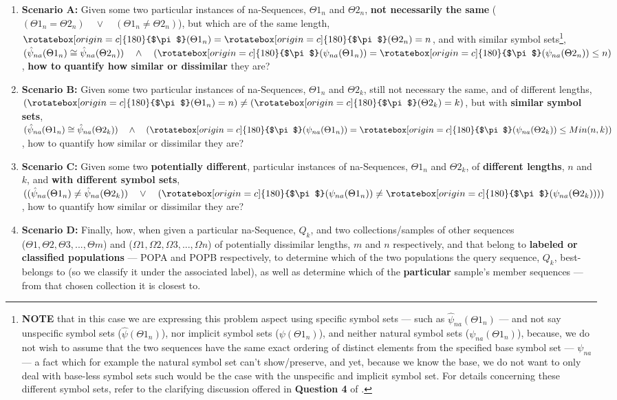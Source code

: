 \documentclass[a4paper, 18pt]{book} %
\newcommand{\invpi}{\rotatebox[origin=c]{180}{$\pi$}}
\begin{document}
\begin{enumerate}
\item \textbf{Scenario A:} Given some two particular instances of na-Sequences, $\Theta1_n$ and $\Theta2_n$, \textbf{not necessarily the same} ($(\Theta1_n = \Theta2_n) \quad \lor \quad (\Theta1_n \neq \Theta2_n)$), but which are of the same length, $\invpi(\Theta1_n) = \invpi(\Theta2_n) = n$, and with similar symbol sets\footnote{\textbf{NOTE} that in this case we are expressing this problem aspect using specific symbol sets --- such as $\hat{\psi}_{na}(\Theta1_n)$ --- and not say unspecific symbol sets ($\hat{\psi}(\Theta1_n)$), nor implicit symbol sets ($\psi(\Theta1_n)$), and neither natural symbol sets ($\psi_{na}(\Theta1_n)$), because, we do not wish to assume that the two sequences have the same exact ordering of distinct elements from the specified base symbol set --- $\psi_{na}$ --- a fact which for example the natural symbol set can't show/preserve, and yet, because we know the base, we do not want to only deal with base-less symbol sets such would be the case with the unspecific and implicit symbol set. For details concerning these different symbol sets, refer to the clarifying discussion offered in \textbf{Question 4} of \cite{transformatics_interview}.}, $(\hat{\psi}_{na}(\Theta1_n) \cong \hat{\psi}_{na}(\Theta2_n)) \quad \land \quad (\invpi(\psi_{na}(\Theta1_n)) = \invpi(\psi_{na}(\Theta2_n)) \leq n)$, \textbf{how to quantify how similar or dissimilar} they are?
\item \textbf{Scenario B:} Given some two particular instances of na-Sequences, $\Theta1_n$ and $\Theta2_k$, still not necessary the same, and of different lengths, $(\invpi(\Theta1_n) = n) \neq (\invpi(\Theta2_k) = k)$, but with \textbf{similar symbol sets}, $(\hat{\psi}_{na}(\Theta1_n) \cong \hat{\psi}_{na}(\Theta2_k)) \quad \land \quad (\invpi(\psi_{na}(\Theta1_n)) = \invpi(\psi_{na}(\Theta2_k)) \leq Min(n,k))$, how to quantify how similar or dissimilar they are?
\item \textbf{Scenario C:} Given some two \textbf{potentially different}, particular instances of na-Sequences, $\Theta1_n$ and $\Theta2_k$, of \textbf{different lengths}, $n$ and $k$, and \textbf{with different symbol sets}, $((\hat{\psi}_{na}(\Theta1_n) \neq \hat{\psi}_{na}(\Theta2_k)) \quad \lor \quad (\invpi(\psi_{na}(\Theta1_n)) \neq \invpi(\psi_{na}(\Theta2_k))))$, how to quantify how similar or dissimilar they are?
\item \textbf{Scenario D:} Finally, how, when given a particular na-Sequence, $Q_k$, and two collections/samples of other sequences\\
 ($\Theta1, \Theta2, \Theta3,..., \Theta m$) and ($\Omega1, \Omega2, \Omega3,..., \Omega n$) of potentially dissimilar lengths, $m$ and $n$ respectively, and that belong to \textbf{labeled or classified populations} --- POPA and POPB respectively, to determine which of the two populations the query sequence, $Q_k$, best-belongs to (so we classify it under the associated label), as well as determine which of the \textbf{particular} sample's member sequences --- from that chosen collection it is closest to.
\end{enumerate}
\end{document}
